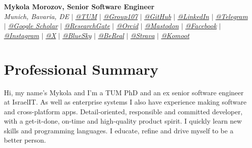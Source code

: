 \documentclass[letterpaper,10pt]{article}
\newcommand{\sectionspace}{
\vspace{-20pt}
}
\begin{document}
	

\begin{flushleft}
    \textbf{\large Mykola Morozov, Senior Software Engineer} \\    
    \textit{Munich, Bavaria, DE} $|$ 
    \href{mailto:mykola.morozov@tum.de}{{\textit{@TUM}}} $|$
    \href{mailto:mykola@group107.com}{{\textit{@Group107}}} $|$
    \href{https://github.com/mykolamor}{{\textit{@GitHub}}} $|$
    \href{https://www.linkedin.com/in/mykola-mor}{{\textit{@LinkedIn}}} $|$
    \href{https://t.me/mykolamor}{{\textit{@Telegram}}} $|$
    \href{https://scholar.google.com/citations?user=MwdhZtkAAAAJ&hl=en}{{\textit{@Google Scholar}}} $|$
    \href{https://www.researchgate.net/profile/Mykola_Morozov3}{{\textit{@ResearchGate}}} $|$
    \href{https://orcid.org/0000-0002-5892-6936}{{\textit{@Orcid}}} $|$
    \href{https://mastodon.social/@mykolamor}{{\textit{@Mastodon}}} $|$
    \href{https://www.facebook.com/mykolamor}{{\textit{@Facebook}}} $|$
    \href{https://www.instagram.com/mykolamor}{{\textit{@Instagram}}} $|$
    \href{https://x.com/MykolaMor}{{\textit{@X}}} $|$
    \href{https://bsky.app/profile/mykolamor.bsky.social}{{\textit{@BlueSky}}} $|$
    \href{https://bere.al/mykolamor}{{\textit{@BeReal}}} $|$
    \href{https://www.strava.com/athletes/mykolamor}{{\textit{@Strava}}} $|$
    \href{https://www.komoot.com/user/4341478648996}{{\textit{@Komoot}}}
    \vspace{-8pt}
\end{flushleft}
	

\section{Professional Summary}
\vspace{-3pt}
\begin{itemize}[leftmargin=0.15in, label={}]
    {\item{
     {Hi, my name's Mykola and I'm a TUM PhD and an ex senior software engineer at IsraelIT. As well as enterprise systems I also have experience making software and cross-platform apps. Detail-oriented, responsible and committed developer, with a get-it-done, on-time and high-quality product spirit. I quickly learn new skills and programming languages. I educate, refine and drive myself to be a better person.} \\      
    }}
 \end{itemize}
 \sectionspace
	
\end{document}
